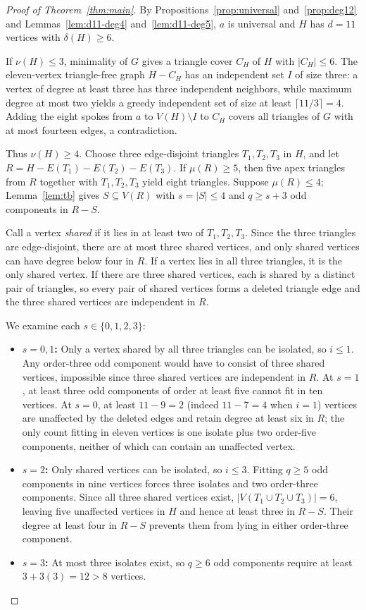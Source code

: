 \documentclass[11pt]{article}
\begin{document}
\begin{proof}[Proof of Theorem~\ref{thm:main}]
By Propositions~\ref{prop:universal} and~\ref{prop:deg12} and Lemmas~\ref{lem:d11-deg4} and~\ref{lem:d11-deg5}, $a$ is universal and $H$ has $d=11$ vertices with $\delta(H)\geq 6$.

If $\nu(H)\leq 3$, minimality of $G$ gives a triangle cover $C_H$ of $H$ with $|C_H|\leq 6$. The eleven-vertex triangle-free graph $H-C_H$ has an independent set $I$ of size three: a vertex of degree at least three has three independent neighbors, while maximum degree at most two yields a greedy independent set of size at least $\lceil 11/3\rceil=4$. Adding the eight spokes from $a$ to $V(H)\setminus I$ to $C_H$ covers all triangles of $G$ with at most fourteen edges, a contradiction.

Thus $\nu(H)\geq 4$. Choose three edge-disjoint triangles $T_1,T_2,T_3$ in $H$, and let $R=H-E(T_1)-E(T_2)-E(T_3)$. If $\mu(R)\geq 5$, then five apex triangles from $R$ together with $T_1,T_2,T_3$ yield eight triangles. Suppose $\mu(R)\leq 4$; Lemma~\ref{lem:tb} gives $S\subseteq V(R)$ with $s=|S|\leq 4$ and $q\geq s+3$ odd components in $R-S$.

Call a vertex \emph{shared} if it lies in at least two of $T_1,T_2,T_3$. Since the three triangles are edge-disjoint, there are at most three shared vertices, and only shared vertices can have degree below four in $R$. If a vertex lies in all three triangles, it is the only shared vertex. If there are three shared vertices, each is shared by a distinct pair of triangles, so every pair of shared vertices forms a deleted triangle edge and the three shared vertices are independent in $R$.

We examine each $s\in\{0,1,2,3\}$:
\begin{itemize}
\item \textbf{$s=0,1$:} Only a vertex shared by all three triangles can be isolated, so $i\leq 1$. Any order-three odd component would have to consist of three shared vertices, impossible since three shared vertices are independent in $R$. At $s=1$, at least three odd components of order at least five cannot fit in ten vertices. At $s=0$, at least $11-9=2$ (indeed $11-7=4$ when $i=1$) vertices are unaffected by the deleted edges and retain degree at least six in $R$; the only count fitting in eleven vertices is one isolate plus two order-five components, neither of which can contain an unaffected vertex.
\item \textbf{$s=2$:} Only shared vertices can be isolated, so $i\leq 3$. Fitting $q\geq 5$ odd components in nine vertices forces three isolates and two order-three components. Since all three shared vertices exist, $|V(T_1\cup T_2\cup T_3)|=6$, leaving five unaffected vertices in $H$ and hence at least three in $R-S$. Their degree at least four in $R-S$ prevents them from lying in either order-three component.
\item \textbf{$s=3$:} At most three isolates exist, so $q\geq 6$ odd components require at least $3+3(3)=12>8$ vertices.
\end{itemize}


\end{proof}
\end{document}
